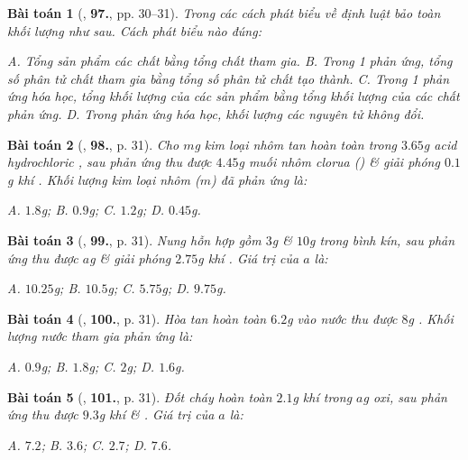 \documentclass{article}
\numberwithin{equation}{section}
\newtheorem{baitoan}{Bài toán}
\begin{document}
\begin{baitoan}[\cite{An2011}, \textbf{97.}, pp. 30--31]
	Trong các cách phát biểu về định luật bảo toàn khối lượng như sau. Cách phát biểu nào đúng:
	
		{\sf A.} Tổng sản phẩm các chất bằng tổng chất tham gia.
		{\sf B.} Trong 1 phản ứng, tổng số phân tử chất tham gia bằng tổng số phân tử chất tạo thành.
		{\sf C.} Trong 1 phản ứng hóa học, tổng khối lượng của các sản phẩm bằng tổng khối lượng của các chất phản ứng.
		{\sf D.} Trong phản ứng hóa học, khối lượng các nguyên tử không đổi.
	
\end{baitoan}

\begin{baitoan}[\cite{An2011}, \textbf{98.}, p. 31]
	Cho $m$g kim loại nhôm tan hoàn toàn trong $3.65$g acid hydrochloric , sau phản ứng thu được $4.45$g muối nhôm clorua () \& giải phóng $0.1$g khí . Khối lượng kim loại nhôm ($m$) đã phản ứng là:
	
		{\sf A.} $1.8$g;
		{\sf B.} $0.9$g;
		{\sf C.} $1.2$g;
		{\sf D.} $0.45$g.
	
\end{baitoan}

\begin{baitoan}[\cite{An2011}, \textbf{99.}, p. 31]
	Nung hỗn hợp gồm $3$g  \& $10$g  trong bình kín, sau phản ứng thu được $a$g  \& giải phóng $2.75$g khí . Giá trị của $a$ là:
	
		{\sf A.} $10.25$g;
		{\sf B.} $10.5$g;
		{\sf C.} $5.75$g;
		{\sf D.} $9.75$g.
	
\end{baitoan}

\begin{baitoan}[\cite{An2011}, \textbf{100.}, p. 31]
	Hòa tan hoàn toàn $6.2$g  vào nước thu được $8$g . Khối lượng nước tham gia phản ứng là:
	
		{\sf A.} $0.9$g;
		{\sf B.} $1.8$g;
		{\sf C.} $2$g;
		{\sf D.} $1.6$g.
	
\end{baitoan}

\begin{baitoan}[\cite{An2011}, \textbf{101.}, p. 31]
	Đốt cháy hoàn toàn $2.1$g khí  trong $a$g oxi, sau phản ứng thu được $9.3$g khí  \& . Giá trị của $a$ là:
	
		{\sf A.} $7.2$;
		{\sf B.} $3.6$;
		{\sf C.} $2.7$;
		{\sf D.} $7.6$.
	
\end{baitoan}
\end{document}
